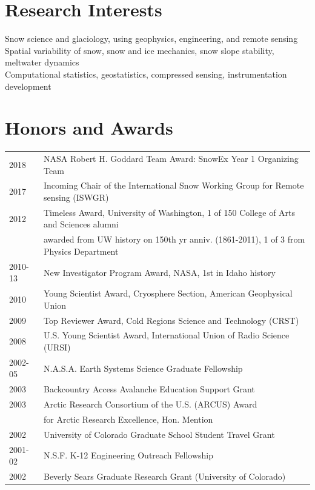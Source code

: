 \documentclass[11pt]{article}
\begin{document}
\section*{Research Interests}
Snow science and glaciology, using geophysics, engineering, and remote sensing \\
Spatial variability of snow, snow and ice mechanics, snow slope stability, meltwater dynamics \\
Computational statistics, geostatistics, compressed sensing, instrumentation development \\



\section*{Honors and Awards}
\begin{tabular}{ll}
2018 & NASA Robert H. Goddard Team Award: SnowEx Year 1 Organizing Team \\
2017 & Incoming Chair of the International Snow Working Group for Remote sensing (ISWGR) \\
2012 & Timeless Award, University of Washington, 1 of 150 College of Arts and Sciences alumni  \\
& awarded from UW history on 150th yr anniv. (1861-2011), 1 of 3 from Physics Department \\
2010-13 & New Investigator Program Award, NASA, 1st in Idaho history \\
2010 & Young Scientist Award, Cryosphere Section, American Geophysical Union \\
2009 & Top Reviewer Award, Cold Regions Science and Technology (CRST) \\
2008 & U.S. Young Scientist Award, International Union of Radio Science (URSI) \\
2002-05 & N.A.S.A. Earth Systems Science Graduate Fellowship \\
2003 & Backcountry Access Avalanche Education Support Grant \\
2003 & Arctic Research Consortium of the U.S. (ARCUS) Award \\
& for Arctic Research Excellence, Hon. Mention \\
2002 & University of Colorado Graduate School Student Travel Grant \\
2001-02 & N.S.F. K-12 Engineering Outreach Fellowship \\
2002 & Beverly Sears Graduate Research Grant (University of Colorado) \\

\end{tabular}
\end{document}
